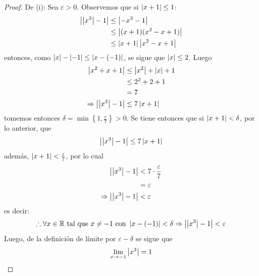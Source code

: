 \documentclass[12pt]{article}
\begin{document}
\begin{enumerate}
    \begin{proof}
        De (i): Sea $\varepsilon>0$. Observemos que si $\left| x+1 \right|\leq1$:
        \begin{equation*}
            \begin{split}
                \left| \left| x^3 \right|-1 \right|&\leq\left| -x^3-1 \right|\\
                &\leq\left| (x+1)(x^2-x+1) \right|\\
                &\leq\left| x+1 \right|\left| x^2-x+1 \right|\\
            \end{split}
        \end{equation*}
        entonces, como $\left| x \right|-\left| -1 \right|\leq\left| x-(-1) \right|$, se sigue que $\left| x \right|\leq2$. Luego
        \begin{equation*}
            \begin{split}
                \left| x^2+x+1 \right|&\leq\left| x^2 \right|+\left| x \right|+1\\
                &\leq 2^2+2+1\\
                &=7\\
                \Rightarrow \left| \left| x^3 \right|-1 \right|&\leq7\left| x+1 \right|
            \end{split}
        \end{equation*}
        tomemos entonces $\delta=\min\left\{1,\frac{\varepsilon}{7}\right\}>0$. Se tiene entonces que si $\left| x+1 \right|<\delta$, por lo anterior, que 
        \begin{equation*}
            \left| \left| x^3 \right|-1 \right|\leq7\left| x+1 \right|
        \end{equation*}
        además, $\left| x+1 \right|<\frac{\varepsilon}{7}$, por lo cual
        \begin{equation*}
            \begin{split}
                \left| \left| x^3 \right|-1 \right|&<7\cdot\frac{\varepsilon}{7}\\
                &=\varepsilon\\
                \Rightarrow \left| \left| x^3 \right|-1 \right|&<\varepsilon \\
            \end{split}
        \end{equation*}
        es decir:
        \begin{equation*}
            \therefore \forall x\in\mathbb{R}\textup{ tal que }x\neq-1\textup{ con } \left| x-(-1) \right|<\delta\Rightarrow \left| \left| x^3 \right|-1 \right|<\varepsilon
        \end{equation*}
        Luego, de la definición de límite por $\varepsilon-\delta$ se sigue que
        \begin{equation*}
            \lim_{ x\rightarrow-1}\left| x^3 \right|=1
        \end{equation*}


\end{proof}
\end{enumerate}
\end{document}
